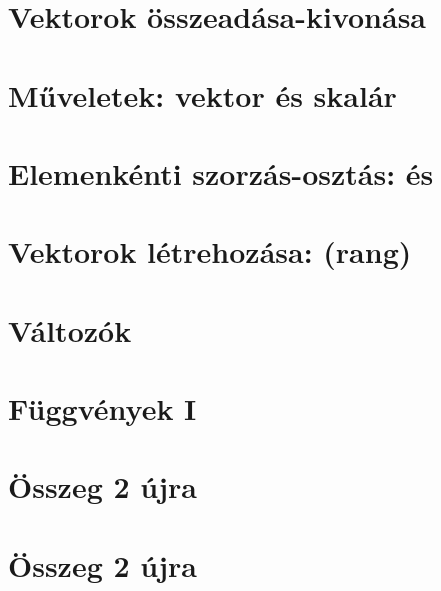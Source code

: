 \begin{spacing}{1.4}
\section*{Vektorok összeadása-kivonása} \label{DBmatlabia6s}
\Desc{

}
\vspace{0.5cm}
\newpage
\section*{Műveletek: vektor és skalár} \label{DBmatlabia7}
\Desc{

}
\vspace{0.5cm}
\newpage
\section*{Elemenkénti szorzás-osztás:  és } \label{DBmatlabia8}
\Desc{

}
\vspace{0.5cm}
\newpage
\section*{Vektorok létrehozása: \mcode{:} (rang)} \label{DBmatlabia9}
\Desc{

}
\vspace{0.5cm}
\newpage
\section*{Változók} \label{DBmatlabia10}
\Desc{

}
\vspace{0.5cm}
\newpage
\section*{Függvények I} \label{DBmatlabia11}
\Desc{

}
\vspace{0.5cm}
\newpage
\section*{Összeg 2 újra} \label{DBmatlabia12}
\Fa{

}
\vspace{0.5cm}
\newpage
\section*{Összeg 2 újra} \label{DBmatlabia12Mo}
\Mo{

}
\vspace{0.5cm}
\newpage

\end{spacing}

